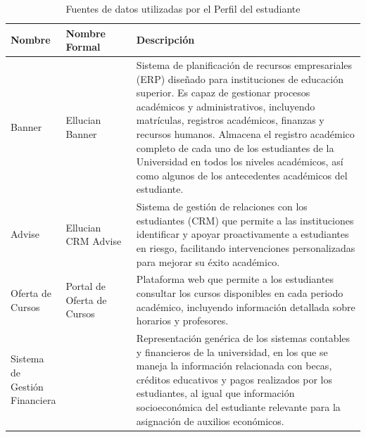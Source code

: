 \begin{table}[h]
	\caption{Fuentes de datos utilizadas por el Perfil del estudiante}
	\centering
	\alternatecolors
	\begin{tabular}{p{0.15\linewidth}p{0.2\linewidth}p{0.65\linewidth}}
		\hline
		\textbf{Nombre}               & \textbf{Nombre Formal}     & \textbf{Descripción}                                                                                                                                                                                                                                                                                                                                                                                                                                       \\
		\hline
		Banner                        & Ellucian Banner            & Sistema de planificación de recursos empresariales (ERP) diseñado para instituciones de educación superior. Es capaz de gestionar procesos académicos y administrativos, incluyendo matrículas, registros académicos, finanzas y recursos humanos. \cite{banner} Almacena el registro académico completo de cada uno de los estudiantes de la Universidad en todos los niveles académicos, así como algunos de los antecedentes académicos del estudiante. \\
		Advise                        & Ellucian CRM Advise        & Sistema de gestión de relaciones con los estudiantes (CRM) que permite a las instituciones identificar y apoyar proactivamente a estudiantes en riesgo, facilitando intervenciones personalizadas para mejorar su éxito académico. \cite{advise}                                                                                                                                                                                                           \\
		Oferta de Cursos              & Portal de Oferta de Cursos & Plataforma web que permite a los estudiantes consultar los cursos disponibles en cada periodo académico, incluyendo información detallada sobre horarios y profesores. \cite{oferta_cursos}                                                                                                                                                                                                                                                                \\
		Sistema de Gestión Financiera &                            & Representación genérica de los sistemas contables y financieros de la universidad, en los que se maneja la información relacionada con becas, créditos educativos y pagos realizados por los estudiantes, al igual que información socioeconómica del estudiante relevante para la asignación de auxilios económicos.                                                                                                                                      \\
		\hline
	\end{tabular}
	\label{tab:fuentes_datos}
\end{table}

